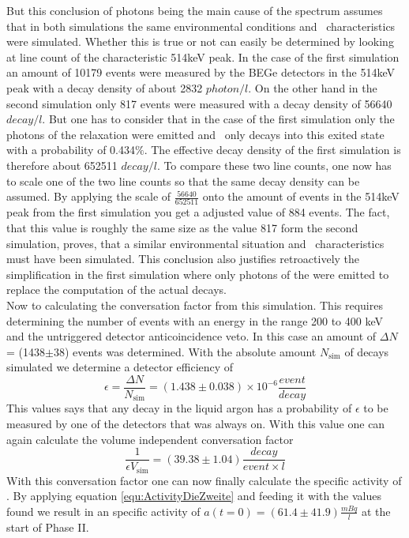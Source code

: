 \documentclass[encoding=utf8,british]{tumphthesis}
\begin{document}
But this conclusion of photons being the main cause of the spectrum assumes that in both simulations the same environmental conditions and \Kr\ characteristics were simulated.
Whether this is true or not can easily be determined by looking at line count of the characteristic 514keV peak.
In the case of the first simulation an amount of 10179 events were measured by the BEGe detectors in the 514keV peak with a decay density of about 2832 $\unit{photon}/\unit{l}$.
On the other hand in the second simulation only 817 events were measured with a decay density of 56640$\unit{decay}/\unit{l}$.
But one has to consider that in the case of the first simulation only the photons of the  relaxation were emitted and \Kr\ only decays into this exited state with a probability of 0.434$\%$.
The effective decay density of the first simulation is therefore about 652511 $\unit{decay}/\unit{l}$.
To compare these two line counts, one now has to scale one of the two line counts so that the same decay density can be assumed.
By applying the scale of $\frac{56640}{652511}$ onto the amount of events in the 514keV peak from the first simulation you get a adjusted value of 884 events.
The fact, that this value is roughly the same size as the value 817 form the second simulation, proves, that a similar environmental situation and \Kr\ characteristics must have been simulated.
This conclusion also justifies retroactively the simplification in the first simulation where only photons of the  were emitted to replace the computation of the actual decays.
\\

Now to calculating the conversation factor from this simulation.
This requires determining the number of events with an energy in the range 200 to 400 keV and the untriggered detector anticoincidence veto.
In this case an amount of $\Delta N$ = (1438$\pm$38) events was determined.
With the absolute amount $N_{\mathrm{sim}}$ of decays simulated we determine a detector efficiency of
\begin{equation*}
    \epsilon = \frac{\Delta N}{N_{\mathrm{sim}}} = (1.438\pm0.038)\times10^{-6} \frac{\unit{event}}{\unit{decay}}
\end{equation*}
This values says that any decay in the liquid argon has a probability of $\epsilon$ to be measured by one of the detectors that was always on.
With this value one can again calculate the volume independent conversation factor
\begin{equation*}
    \frac{1}{\epsilon V_{\mathrm{sim}}} = (39.38\pm1.04) \frac{\unit{decay}}{\unit{event} \times \unit{l} }
\end{equation*}
With this conversation factor one can now finally calculate the specific activity of \Kr.
By applying equation \ref{equ:ActivityDieZweite} and feeding it with the values found we result in an specific activity of $a(t=0) = (61.4\pm41.9) \frac{\unit{mBq}}{\unit{l}}$ at the start of Phase II.
\end{document}
